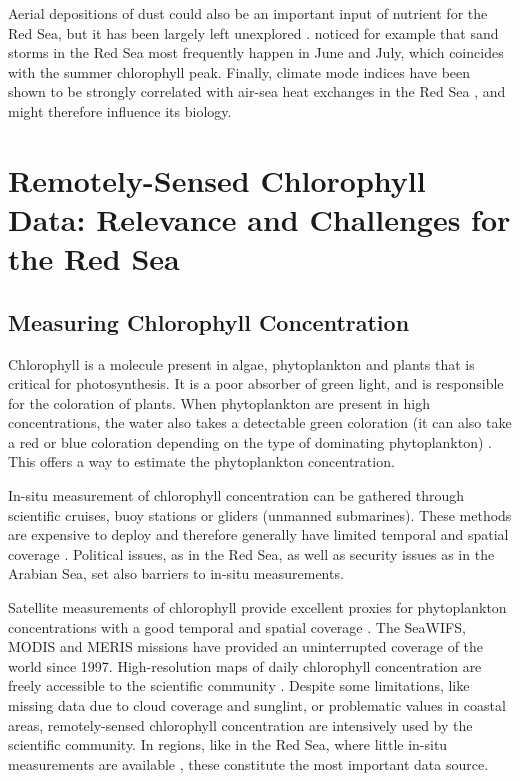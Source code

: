 Aerial depositions of dust could also be an important input of nutrient for the 
Red Sea, but it has been largely left unexplored \citep{Triantafyllou2014}. 
\citet{Raitsos2013} noticed for example that sand storms in the Red Sea most 
frequently happen in June and July, which coincides with the summer chlorophyll 
peak. Finally, climate mode indices have been shown to be strongly correlated 
with air-sea heat exchanges in the Red Sea \citep{Abulnaja2015}, and might 
therefore influence its biology.

\section{Remotely-Sensed Chlorophyll Data: Relevance and Challenges for the Red
Sea}

\subsection{Measuring Chlorophyll Concentration}

Chlorophyll is a molecule present in algae, phytoplankton and plants that is 
critical for photosynthesis. It is a poor absorber of green light, and is 
responsible for the coloration of plants. When phytoplankton are present in high 
concentrations, the water also takes a detectable green coloration (it can also 
take a red or blue coloration depending on the type of dominating phytoplankton) 
\citep{Robinson2010}. This offers a way to estimate the phytoplankton 
concentration.

In-situ measurement of chlorophyll concentration can be gathered through 
scientific cruises, buoy stations or gliders (unmanned submarines). These 
methods are expensive to deploy and therefore generally have limited temporal 
and spatial coverage \citep{Robinson2010}. Political issues, as in the Red Sea, 
as well as security issues as in the Arabian Sea, set also barriers to in-situ 
measurements.

Satellite measurements of chlorophyll provide excellent proxies for 
phytoplankton concentrations with a good temporal and spatial coverage 
\citep{Robinson2010}. The SeaWIFS, MODIS and MERIS missions have provided an 
uninterrupted coverage of the world since 1997. High-resolution maps of daily 
chlorophyll concentration are freely accessible to the scientific community 
\citep{McClain2009}. Despite some limitations, like missing data due to cloud 
coverage and sunglint, or problematic values in coastal areas, remotely-sensed 
chlorophyll concentration are intensively used by the scientific community. In 
regions, like in the Red Sea, where little in-situ measurements are available 
\citep{Raitsos2013, Brewin2013}, these constitute the most important data 
source.

